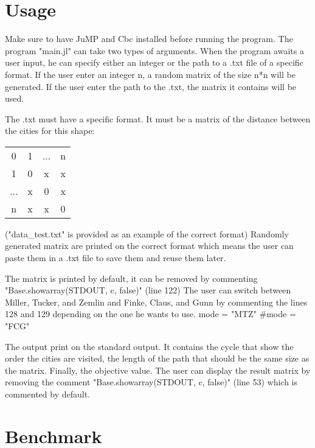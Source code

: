 \section{Usage}

Make sure to have JuMP and Cbc installed before running the program.\newline
The program "main.jl" can take two types of arguments. When the program awaits a user input,
he can specify either an integer or the path to a .txt file of a specific format.
If the user enter an integer n, a random matrix of the size n*n will be generated.
If the user enter the path to the .txt, the matrix it contains will be used.\newline

The .txt must have a specific format. It must be a matrix of the distance between the cities for this shape:\newline

\begin{tabular}{|c|c|c|c|}
  0 & 1 & ... & n \\
  1 & 0 & x & x \\
  ... & x & 0 & x \\
  n & x & x & 0 \\
\end{tabular}
\bigbreak

("data\_test.txt" is provided as an example of the correct format)\newline
Randomly generated matrix are printed on the correct format which means the user can paste them in a
.txt file to save them and reuse them later.\newline

The matrix is printed by default, it can be removed by commenting
"Base.showarray(STDOUT, c, false)" (line 122)\newline
The user can switch between Miller, Tucker, and Zemlin and Finke, Claus, and Gunn by commenting the
lines 128 and 129 depending on
the one he wants to use.
\bigbreak
mode = "MTZ"\newline
\#mode = "FCG"
\bigbreak

The output print on the standard output.
It contains the cycle that show the order the cities are visited, the length of the path that should be the same size as
the matrix. Finally, the objective value. The user can display the result matrix by removing the comment
"Base.showarray(STDOUT, c, false)" (line 53) which is commented by default.

\section{Benchmark}

